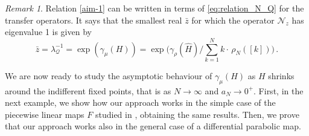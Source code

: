 \documentclass{amsart}
\theoremstyle{definition}
\theoremstyle{remark}
\newtheorem{rem}[theorem]{Remark}
\theoremstyle{definition}
\numberwithin{equation}{section}
\newcommand{\CN}{{\mathcal N}}
\newcommand{\CQ}{{\mathcal Q}}
\begin{document}
\begin{rem}
Relation \eqref{aim-1} can be written in terms of \eqref{eq:relation_N_Q} for the transfer operators. It says that the smallest real $\bar z$ for which the operator $\CN_z$ has eigenvalue 1 is given by 
\[
\bar z = \lambda_\CQ^{-1} = \exp (\gamma_\mu(H)) = \exp\Big(\gamma_\rho(\hat{H})\Big/ \sum\limits_{k=1}^{N} k \cdot \, \rho_{N}([k])\Big)\, .
\]
\end{rem}

We are now ready to study the asymptotic behaviour of $\gamma_\mu(H)$ as $H$ shrinks around the indifferent fixed points, that is as $N\to \infty$ and $a_N\to 0^+$. First, in the next example, we show how our approach works in the simple case of the piecewise linear maps $F$ studied in \cite{MK}, obtaining the same results. Then, we prove that our approach works also in the general case of a differential parabolic map.
\end{document}
